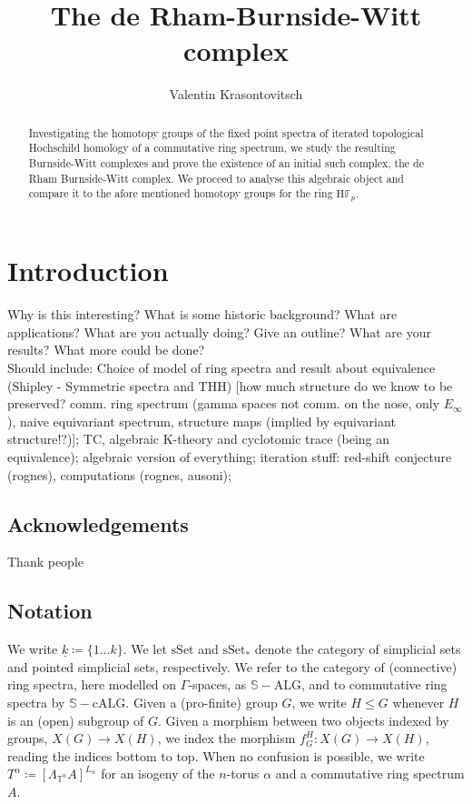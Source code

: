 \documentclass[10pt, a4paper, UKenglish]{article}
\title{The de Rham-Burnside-Witt complex}
\author{Valentin Krasontovitsch}
\numberwithin{equation}{section}
\newcommand{\bF}{\mathbb{F}}
\newcommand{\rH}{\mathrm{H}}
\newcommand{\bS}{\mathbb{S}}
\newcommand{\sT}{\mathbb{T}}		%
\newcommand{\defas}{\coloneqq}  %
\newcommand{\abs}[1]{\left\vert#1\right\vert}	%
\newcommand{\calg}{\mathrm{cALG}}
\newcommand{\alg}{\mathrm{ALG}}
\theoremstyle{plain}
\theoremstyle{definition}
\renewcommand{\to}{\longrightarrow}
\newcommand{\sS}{\mathrm{sSet}}
\begin{document}
\begin{abstract}
Investigating the homotopy groups of the fixed point spectra of iterated topological Hochschild homology of a commutative ring spectrum, we study the resulting Burnside-Witt complexes and prove the existence of an initial such complex, the de Rham Burnside-Witt complex. We proceed to analyse this algebraic object and compare it to the afore mentioned homotopy groups for the ring $\rH\bF_p$.
\end{abstract}
%
{\let\newpage\relax\maketitle}
\maketitle
%
%
%
%
\section{Introduction}
Why is this interesting? What is some historic background? What are applications? What are you actually doing? Give an outline? What are your results? What more could be done?\\
Should include: Choice of model of ring spectra and result about equivalence (Shipley - Symmetric spectra and THH) [how much structure do we know to be preserved? comm. ring spectrum (gamma spaces not comm. on the nose, only $E_\infty$), naive equivariant spectrum, structure maps (implied by equivariant structure!?)]; TC, algebraic K-theory and cyclotomic trace (being an equivalence); algebraic version of everything; iteration stuff: red-shift conjecture (rognes), computations (rognes, ausoni);
\subsection{Acknowledgements}
Thank people %
\subsection{Notation}
We write $\underline{k} \coloneqq \{1 \ldots k \}$. We let $\sS$ and $\sS_*$ denote the category of simplicial sets and pointed simplicial sets, respectively. We refer to the category of (connective) ring spectra, here modelled on $\Gamma$-spaces, as $\bS-\alg$, and to commutative ring spectra by $\bS-\calg$. Given a (pro-finite) group $G$, we write $H \leq G$ whenever $H$ is an (open) subgroup of $G$. Given a morphism between two objects indexed by groups, $X(G) \to X(H)$, we index the morphism $f_G^H: X(G) \to X(H)$, reading the indices bottom to top. When no confusion is possible, we write $T^\alpha \defas [\Lambda_{\sT^n} A]^{L_\alpha}$ for an isogeny of the $n$-torus $\alpha$ and a commutative ring spectrum $A$.
\end{document}
